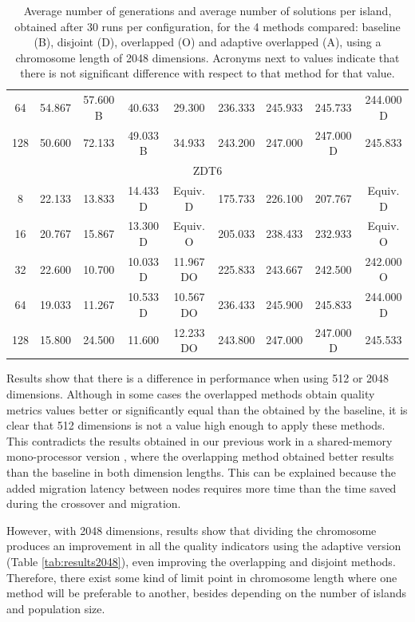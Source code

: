 \documentclass[preprint]{elsarticle}
\begin{document}
\begin{table}
{\begin{tabular}{|c||c|c|c|c||c|c|c|c||}
64	&	54.867		&	57.600	B	&	40.633			&	29.300			&	236.333		&	245.933			&	245.733			&	244.000	D			\\
128	&	50.600		&	72.133		&	49.033	B		&	34.933			&	243.200		&	247.000			&	247.000	D		&	245.833				\\ \hline
\multicolumn{9}{|c|}{ZDT6}																															\\ \hline
8	&	22.133		&	13.833		&	14.433	D		&	Equiv. D			&	175.733		&	226.100			&	207.767			&	Equiv. D				\\
16	&	20.767		&	15.867		&	13.300	D		&	Equiv. O			&	205.033		&	238.433			&	232.933			&	Equiv. O				\\
32	&	22.600		&	10.700		&	10.033	D		&	11.967	DO		&	225.833		&	243.667			&	242.500			&	242.000	O			\\
64	&	19.033		&	11.267		&	10.533	D		&	10.567	DO		&	236.433		&	245.900			&	245.833			&	244.000	D			\\
128	&	15.800		&	24.500		&	11.600			&	12.233	DO		&	243.800		&	247.000			&	247.000	D		&	245.533				\\ \hline
\end{tabular}
}
\caption{Average number of generations and average number of solutions per island, obtained after 30 runs per configuration, for the 4 methods compared: baseline (B), disjoint (D), overlapped (O) and adaptive overlapped (A), using a chromosome length of 2048 dimensions. Acronyms next to values indicate that there is not significant difference with respect to that method for that value.}
\label{tab:sols2048}
\end{table}

Results show that there is a difference in performance when using 512 or 2048 dimensions. Although in some cases the overlapped methods obtain quality metrics values better or significantly equal than the obtained by the baseline, it is clear that 512 dimensions is not a value high enough to apply these methods. This contradicts the results obtained in our previous work in a shared-memory mono-processor version \citep{Garcia16hpmoon}, where the overlapping method obtained better results than the baseline in both dimension lengths. This can be explained because the added migration latency between nodes requires more time than the time saved during the crossover and migration.

However, with 2048 dimensions, results show that dividing the chromosome produces an improvement in all the quality indicators using the adaptive version (Table \ref{tab:results2048}), even improving the overlapping and disjoint methods. Therefore, there exist some kind of limit point in chromosome length where one method will be preferable to another, besides depending on the number of islands and population size.
\end{document}
